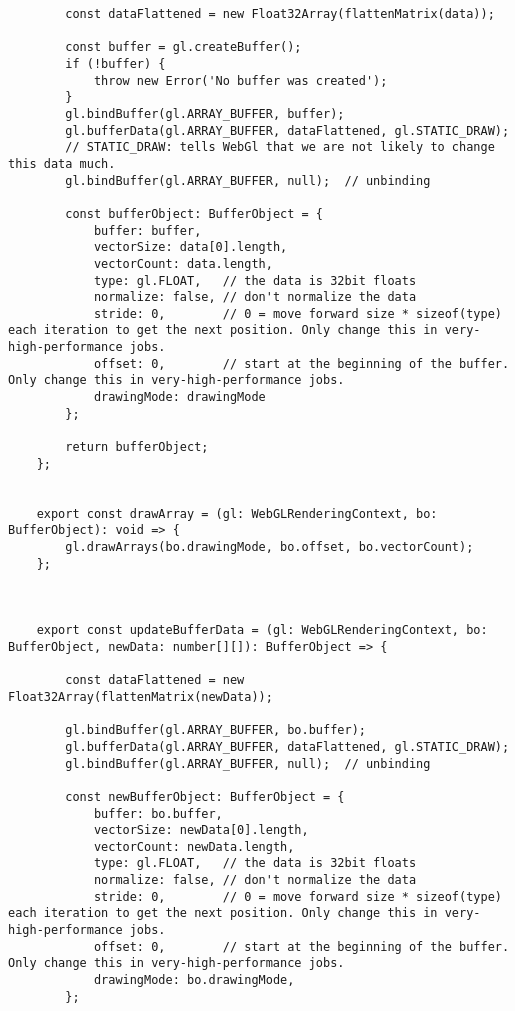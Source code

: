 {\begin{lstlisting}
        const dataFlattened = new Float32Array(flattenMatrix(data));
    
        const buffer = gl.createBuffer();
        if (!buffer) {
            throw new Error('No buffer was created');
        }
        gl.bindBuffer(gl.ARRAY_BUFFER, buffer);
        gl.bufferData(gl.ARRAY_BUFFER, dataFlattened, gl.STATIC_DRAW);
        // STATIC_DRAW: tells WebGl that we are not likely to change this data much.
        gl.bindBuffer(gl.ARRAY_BUFFER, null);  // unbinding
    
        const bufferObject: BufferObject = {
            buffer: buffer,
            vectorSize: data[0].length,
            vectorCount: data.length,
            type: gl.FLOAT,   // the data is 32bit floats
            normalize: false, // don't normalize the data
            stride: 0,        // 0 = move forward size * sizeof(type) each iteration to get the next position. Only change this in very-high-performance jobs.
            offset: 0,        // start at the beginning of the buffer. Only change this in very-high-performance jobs.
            drawingMode: drawingMode
        };
    
        return bufferObject;
    };
    
    
    export const drawArray = (gl: WebGLRenderingContext, bo: BufferObject): void => {
        gl.drawArrays(bo.drawingMode, bo.offset, bo.vectorCount);
    };
    
    
    
    export const updateBufferData = (gl: WebGLRenderingContext, bo: BufferObject, newData: number[][]): BufferObject => {
    
        const dataFlattened = new Float32Array(flattenMatrix(newData));
    
        gl.bindBuffer(gl.ARRAY_BUFFER, bo.buffer);
        gl.bufferData(gl.ARRAY_BUFFER, dataFlattened, gl.STATIC_DRAW);
        gl.bindBuffer(gl.ARRAY_BUFFER, null);  // unbinding
    
        const newBufferObject: BufferObject = {
            buffer: bo.buffer,
            vectorSize: newData[0].length,
            vectorCount: newData.length,
            type: gl.FLOAT,   // the data is 32bit floats
            normalize: false, // don't normalize the data
            stride: 0,        // 0 = move forward size * sizeof(type) each iteration to get the next position. Only change this in very-high-performance jobs.
            offset: 0,        // start at the beginning of the buffer. Only change this in very-high-performance jobs.
            drawingMode: bo.drawingMode,
        };
    

\end{lstlisting}}
